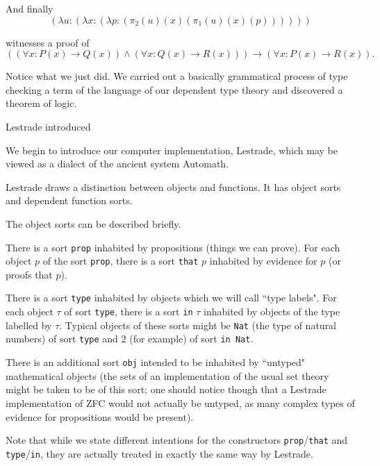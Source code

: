 \documentclass[12pt]{slides}
\begin{document}
\begin{slide}



And finally $$(\lambda u:(\lambda x:(\lambda p:(\pi_2(u)(x)(\pi_1(u)(x)(p))))))$$

witnesses a proof of {\tiny $$((\forall x:P(x) \rightarrow Q(x)) \wedge (\forall x:Q(x) \rightarrow R(x))) \rightarrow (\forall x:P(x) \rightarrow R(x)) .$$}

Notice what we just did.  We carried out a basically grammatical process of type checking a term of the language of our dependent type theory
and discovered a theorem of logic.

\end{slide}

\begin{slide}

{\Large Lestrade introduced}

We begin to introduce our computer implementation, Lestrade, which may be viewed as a dialect of the ancient system Automath.

Lestrade draws a distinction between objects and functions.  It has object sorts and dependent function sorts.

The object sorts can be described briefly.

There is a sort {\tt prop} inhabited by propositions (things we can prove).  For each object $p$ of the sort {\tt prop}, there
is a sort {\tt that} $p$ inhabited by evidence for $p$ (or proofs that $p$).

There is a sort {\tt type} inhabited by objects which we will call ``type labels".  For each object $\tau$ of sort {\tt type}, there is a sort
{\tt in} $\tau$ inhabited by objects of the type labelled by $\tau$.  Typical objects of these sorts might be {\tt Nat} (the type of natural numbers) of sort {\tt type}  and 2 (for example) of sort {\tt in Nat}.

\end{slide}

\begin{slide}

There is an additional sort {\tt obj} intended to be inhabited by ``untyped" mathematical objects (the sets of an implementation of the usual set theory might be taken to be of this sort; one should notice though that a Lestrade implementation of ZFC would not actually be untyped, as many complex types of evidence for propositions would be present).

Note that while we state different intentions for the constructors {\tt prop}/{\tt that} and {\tt type}/{\tt in}, they are actually treated in exactly the same way by Lestrade.

\end{slide}
\end{document}
